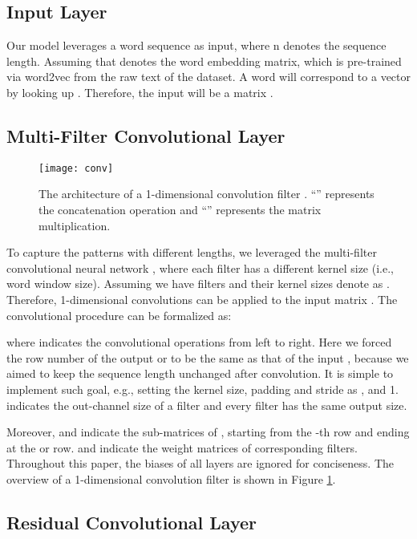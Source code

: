 \documentclass[letterpaper]{article} \usepackage{aaai20}  \usepackage{times}  \usepackage{helvet} \usepackage{courier}  \usepackage[hyphens]{url}  \usepackage{graphicx} \urlstyle{rm} \def\UrlFont{\rm}  \usepackage{graphicx}  \frenchspacing  \setlength{\pdfpagewidth}{8.5in}  \setlength{\pdfpageheight}{11in}
\begin{document}
\subsection{Input Layer}
Our model leverages a word sequence  as input, where n denotes the sequence length. Assuming that  denotes the word embedding matrix, which is pre-trained via word2vec \cite{mikolov2013distributed} from the raw text of the dataset. A word  will correspond to a vector  by looking up . Therefore, the input will be a matrix .

\subsection{Multi-Filter Convolutional Layer}

\begin{figure}[t]
\centering
\texttt{[image: conv]} 
\caption{The architecture of a 1-dimensional convolution filter . ``'' represents the concatenation operation and ``'' represents the matrix multiplication.}
\label{fig:conv}
\end{figure}

To capture the patterns with different lengths, we leveraged the multi-filter convolutional neural network \cite{kim2014convolutional}, where each filter has a different kernel size (i.e., word window size). Assuming we have  filters  and their kernel sizes denote as . Therefore,  1-dimensional convolutions can be applied to the input matrix . The convolutional procedure can be formalized as:


where  indicates the convolutional operations from left to right. Here we forced the row number  of the output  or  to be the same as that of the input , because we aimed to keep the sequence length unchanged after convolution. It is simple to implement such goal, e.g., setting the kernel size, padding and stride as ,  and 1.  indicates the out-channel size of a filter and every filter has the same output size.

Moreover,  and  indicate the sub-matrices of , starting from the -th row and ending at the  or  row.  and  indicate the weight matrices of corresponding filters. Throughout this paper, the biases of all layers are ignored for conciseness. The overview of a 1-dimensional convolution filter  is shown in Figure \ref{fig:conv}.


\subsection{Residual Convolutional Layer}
\end{document}
